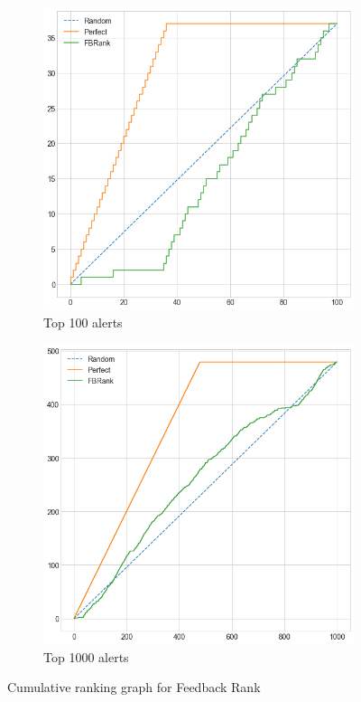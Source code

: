 \begin{figure}[H]
	\begin{subfigure}{.5\textwidth}
		\centering
		\includegraphics[scale=0.3]{./src/fbRank/fbrank_cumulative_graph_top100.png}
		\caption{Top 100 alerts}\label{}
	\end{subfigure}%
	\begin{subfigure}{.5\textwidth}
		\centering
		\includegraphics[scale=0.3]{./src/fbRank/fbrank_cumulative_graph_top1000.png}
		\caption{Top 1000 alerts}\label{}
	\end{subfigure}
	\caption{Cumulative ranking graph for Feedback Rank}
	\label{results:cumulative_fbrank}
\end{figure}


